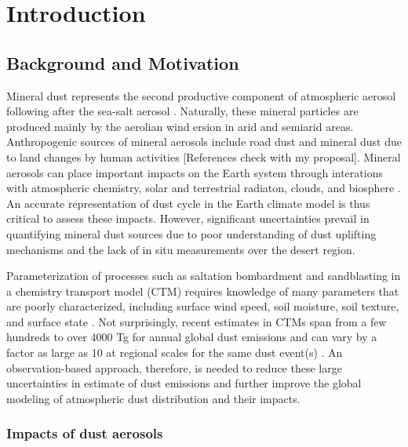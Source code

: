 
\chapter{Introduction}

\section{Background and Motivation}

 Mineral dust represents the second productive component of atmospheric aerosol 
 following after the sea-salt aerosol \citep{textor06}. Naturally, these mineral 
 particles are produced mainly by the aerolian wind ersion in arid and semiarid areas.     
 Anthropogenic sources of mineral aerosols include road dust and mineral dust due to land 
 changes by human activities [References check with my proposal]. Mineral aerosols can place
 important impacts on the Earth system through interations with atmospheric chemistry, 
 solar and terrestrial radiaton, clouds, and biosphere \citep{shao11}. 
 An accurate representation of dust cycle in the Earth climate model is thus critical 
 to assess these impacts. However, significant uncertainties prevail in quantifying 
 mineral dust sources due to poor understanding of dust uplifting mechanisms and the 
 lack of in situ measurements over the desert region. 

 Parameterization of processes such as saltation bombardment and sandblasting in a 
 chemistry transport model (CTM) requires knowledge of many parameters that are 
 poorly characterized, including surface wind speed, soil moisture, soil texture, 
 and surface state \citep{tegen94,ginoux01,zender03a}. Not surprisingly, recent 
 estimates in CTMs span from a few hundreds to over 4000 Tg for annual global 
 dust emissions \citep{huneeus11} and can vary by a factor as large as 10 at 
 regional scales for the same dust event(s) \citep{uno06}. An observation-based 
 approach, therefore, is needed to reduce these large uncertainties in estimate of 
 dust emissions and further improve the global modeling of atmospheric dust distribution 
 and their impacts.

\subsection{Impacts of dust aerosols}

